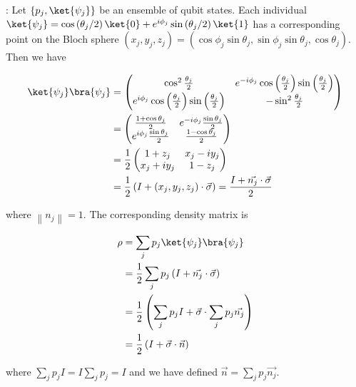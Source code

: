 : Let $\{p_j, \ket{\psi_j}\}$ be an ensemble of qubit states.
Each individual $\ket{\psi_j} = \cos \left( \theta_j / 2 \right) \ket{0} + e^{i
\phi_j} \sin \left( \theta_j / 2 \right) \ket{1}$ has a corresponding point on
the Bloch sphere $\left( x_j, y_j, z_j \right) = \left( \cos \phi_j \sin
\theta_j, \sin \phi_j \sin \theta_j, \cos \theta_j \right)$. Then we have

\begin{align}
\ket{\psi_j} \bra{\psi_j} &= \begin{pmatrix} \cos^2 \frac{\theta_j}{2} & e^{-i
\phi_j} \cos \left( \frac{\theta_j}{2} \right) \sin \left( \frac{\theta_j}{2}
\right) \\ e^{i \phi_j} \cos \left( \frac{\theta_j}{2} \right) \sin \left(
\frac{\theta_j}{2} \right) & -\sin^2 \frac{\theta_j}{2} \end{pmatrix} \\
&= \begin{pmatrix} \frac{1 + \cos \theta_j}{2} & e^{-i \phi_j} \frac{\sin
\theta_j}{2} \\ e^{i \phi_j} \frac{\sin \theta_j}{2}  & \frac{1 - \cos
\theta_j}{2} \end{pmatrix} \\
&= \frac{1}{2} \begin{pmatrix} 1 + z_j & x_j - i y_j \\ x_j + i y_j & 1 - z_j
\end{pmatrix} \\
&= \frac{1}{2} \left( I + \left( x_j, y_j, z_j \right) \cdot \vec{\sigma}
\right) = \frac{I + \vec{n_j} \cdot \vec{\sigma}}{2}
\end{align}

where $\left\lVert n_j \right\rVert = 1$. The corresponding density matrix is

\begin{align}
\rho &= \sum_j{p_j \ket{\psi_j} \bra{\psi_j}} \\
&= \frac{1}{2} \sum_j{p_j \left( I + \vec{n_j} \cdot \vec{\sigma} \right)} \\
&= \frac{1}{2} \left( \sum_j{p_j I} + \vec{\sigma} \cdot \sum_j{p_j \vec{n_j}}
\right) \\
&= \frac{1}{2} \left(I + \vec{\sigma} \cdot \vec{n} \right)
\end{align}

where $\sum_j{p_j I} = I \sum_j{p_j} = I$ and we have defined $\vec{n} =
\sum_j{p_j \vec{n_j}}$.

